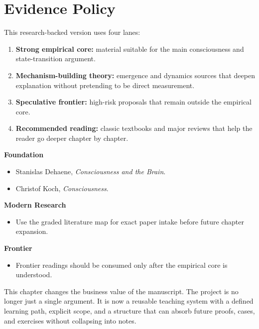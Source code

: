 \section{Evidence Policy}

This research-backed version uses four lanes:
\begin{enumerate}[nosep]
  \item \textbf{Strong empirical core:} material suitable for the main
        consciousness and state-transition argument.
  \item \textbf{Mechanism-building theory:} emergence and dynamics sources that
        deepen explanation without pretending to be direct measurement.
  \item \textbf{Speculative frontier:} high-risk proposals that remain outside
        the empirical core.
  \item \textbf{Recommended reading:} classic textbooks and major reviews that
        help the reader go deeper chapter by chapter.
\end{enumerate}

\begin{readingbox}
\textbf{Foundation}
\begin{itemize}[nosep]
  \item Stanislas Dehaene, \emph{Consciousness and the Brain}.
  \item Christof Koch, \emph{Consciousness}.
\end{itemize}
\textbf{Modern Research}
\begin{itemize}[nosep]
  \item Use the graded literature map for exact paper intake before future
        chapter expansion.
\end{itemize}
\textbf{Frontier}
\begin{itemize}[nosep]
  \item Frontier readings should be consumed only after the empirical core is
        understood.
\end{itemize}
\end{readingbox}

\begin{summarybox}
This chapter changes the business value of the manuscript. The project is no
longer just a single argument. It is now a reusable teaching system with a
defined learning path, explicit scope, and a structure that can absorb future
proofs, cases, and exercises without collapsing into notes.
\end{summarybox}
